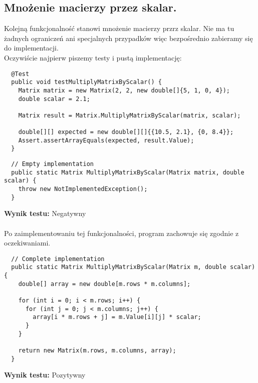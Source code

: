 \documentclass[a4paper,12pt,twoside]{article}
\begin{document}
\subsection{Mnożenie macierzy przez skalar.}
\bigskip

Kolejną funkcjonalność stanowi mnożenie macierzy przrz skalar. Nie ma tu żadnych
ograniczeń ani specjalnych przypadków więc bezpośrednio zabieramy się do implementacji.\\

\noindent
Oczywiście najpierw piszemy testy i pustą implementację:

\begin{lstlisting}
  @Test
  public void testMultiplyMatrixByScalar() {
    Matrix matrix = new Matrix(2, 2, new double[]{5, 1, 0, 4});
    double scalar = 2.1;

    Matrix result = Matrix.MultiplyMatrixByScalar(matrix, scalar);

    double[][] expected = new double[][]{{10.5, 2.1}, {0, 8.4}};
    Assert.assertArrayEquals(expected, result.Value);
  }
\end{lstlisting}

\begin{lstlisting}
  // Empty implementation
  public static Matrix MultiplyMatrixByScalar(Matrix matrix, double scalar) {
    throw new NotImplementedException();
  }
\end{lstlisting}
\medskip

\noindent
\textbf{Wynik testu: }{\color{red} Negatywny}\\\\
Po zaimplementowaniu tej funkcjonalności, program
zachowuje się zgodnie z oczekiwaniami.\\

\begin{lstlisting}
  // Complete implementation
  public static Matrix MultiplyMatrixByScalar(Matrix m, double scalar) {
    double[] array = new double[m.rows * m.columns];

    for (int i = 0; i < m.rows; i++) {
      for (int j = 0; j < m.columns; j++) {
        array[i * m.rows + j] = m.Value[i][j] * scalar;
      }
    }

    return new Matrix(m.rows, m.columns, array);
  }
\end{lstlisting}
\medskip

\noindent
\textbf{Wynik testu: }{\color{green} Pozytywny}


\end{document}
